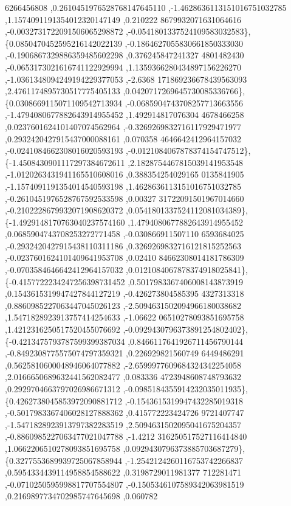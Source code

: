 \begin{DoxyCode}
      6266456808 ,0.2610451976528768147645110 ,-1.4628636113151016751032785 ,1.1574091191354012320147149 ,0.210222
      8679932071631064616 ,-0.0032731722091506065298872 ,-0.0541801337524109583032583\},
\{0.0850470452595216142022139 ,-0.1864627055830661850333030 ,-0.1906867329886359485602298 ,0.376245847241327
      4801482430 ,-0.0653173021616741122929994 ,1.1359366280434897156226270 ,-1.0361348094249194229377053 ,-2.6368
      171869236678439563093 ,2.4761174895730517775405133 ,0.0420717269645730085336766\},
\{0.0308669115071109542713934 ,-0.0685904743708257713663556 ,-1.4794080677882643914955452 ,1.492914817076304
      4678466258 ,0.0237601624101407074562964 ,-0.3269269832716117929471977 ,0.2932420427915437000088161 ,0.070358
      4646642412964157032 ,-0.0241084662308016020593193 ,-0.0121084067878374154747512\},
\{-1.4508430901117297384672611 ,2.1828754467815039141953548 ,-1.0120263431941165510608016 ,0.388354254029165
      0135841905 ,-1.1574091191354014540593198 ,1.4628636113151016751032785 ,-0.2610451976528767592533598 ,0.00327
      31722091501967014660 ,-0.2102228679932071908620372 ,0.0541801337524112081034389\},
\{-1.4929148170763040237574160 ,1.4794080677882643914955452 ,0.0685904743708253272771458 ,-0.030866911507110
      6593684025 ,-0.2932420427915438110311186 ,0.3269269832716121815252563 ,-0.0237601624101409641953708 ,0.02410
      84662308014181786309 ,-0.0703584646642412964157032 ,0.0121084067878374918025841\},
\{-0.4157722234247256398731452 ,0.5017983367406008143873919 ,0.1543615319947427844127219 ,-0.426273804585395
      4327313318 ,0.8860985227063447045026123 ,-2.5094631502094966180038682 ,1.5471828923913757414254633 ,-1.06622
      06510278093851695758 ,1.4212316250517520455076692 ,-0.0929430796373891254802402\},
\{-0.4213475793787599399387034 ,0.8466117641926711456790144 ,-0.8492308775575074797359321 ,0.226929821560749
      6449486291 ,0.5625810600048946064077882 ,-2.6599977609684324342254058 ,2.0166650689632441562082477 ,0.083336
      4723948608748793632 ,0.2929704663797026986671312 ,-0.0985184355914232035011935\},
\{0.4262738045853972090881712 ,-0.1543615319947432285019318 ,-0.5017983367406028127888362 ,0.415772223424726
      9721407747 ,-1.5471828923913797382283519 ,2.5094631502095041675204357 ,-0.8860985227063477021047788 ,-1.4212
      316250517527116414840 ,1.0662206510278093851695758 ,0.0929430796373885703687279\},
\{0.3277553689939725067858944 ,-1.2542124260116753742266837 ,0.5954334439114958854588622 ,0.3198729011981377
      712281471 ,-0.0710250595998817707554807 ,-0.1505346107589342063981519 ,0.2169897734702985747645698 ,0.060782

\end{DoxyCode}
